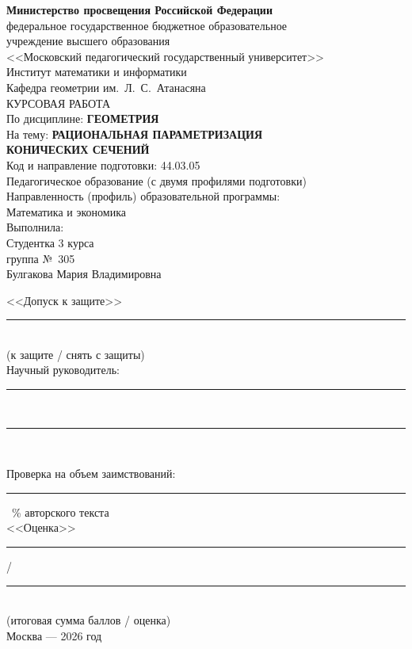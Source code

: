 \documentclass[a4paper,14pt]{extreport}
\theoremstyle{definition}
\begin{document}
\sloppy

\begin{titlepage}
\singlespacing
\centering
{\bfseries Министерство просвещения Российской Федерации}\\[2pt]
федеральное государственное бюджетное образовательное\\
учреждение высшего образования\\
<<Московский педагогический государственный университет>>\\[14pt]

Институт математики и информатики\\
Кафедра геометрии им.~Л.~С.~Атанасяна\\[26pt]

КУРСОВАЯ РАБОТА\\[14pt]

По дисциплине: \textbf{ГЕОМЕТРИЯ}\\[10pt]

На тему: \textbf{РАЦИОНАЛЬНАЯ ПАРАМЕТРИЗАЦИЯ}\\
\textbf{КОНИЧЕСКИХ СЕЧЕНИЙ}\\[14pt]

Код и направление подготовки: 44.03.05\\
Педагогическое образование (с двумя профилями подготовки)\\
Направленность (профиль) образовательной программы:\\
Математика и экономика\\[16pt]

\raggedleft
Выполнила:\\
Студентка 3 курса\\
группа №~305\\
Булгакова Мария Владимировна\\[14pt]

\raggedright
<<Допуск к защите>>\\[10pt]
\rule{6cm}{0.4pt}\\
(к защите / снять с защиты)\\[14pt]

\raggedleft
Научный руководитель:\\[10pt]
\rule{8cm}{0.4pt}\\[4pt]
\rule{8cm}{0.4pt}\\[14pt]

\raggedright
Проверка на объем заимствований:\\
\rule{4cm}{0.4pt}~\% авторского текста\\[10pt]

\raggedleft
<<Оценка>> \rule{2.5cm}{0.4pt}/\rule{2.5cm}{0.4pt}\\
(итоговая сумма баллов / оценка)\\

\vfill
\centering
Москва --- 2026 год
\end{titlepage}
\setcounter{page}{2}
\end{document}
